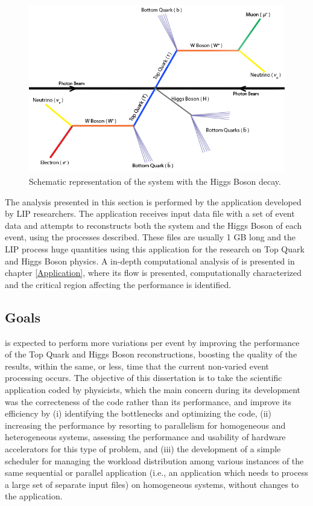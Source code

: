 \begin{figure}[!htp]
	\begin{center}
		\includegraphics[scale=0.5]{../../common/img/ttbar_higgs.png}
		\caption{Schematic representation of the \ttbar system with the Higgs Boson decay.}
		\label{fig:HiggsBosonDecay}
	\end{center}
\end{figure}

The analysis presented in this section is performed by the \tth application developed by LIP researchers. The application receives input data file with a set of event data and attempts to reconstructs both the \ttbar system and the Higgs Boson of each event, using the processes described. These files are usually 1 GB long and the LIP process huge quantities using this application for the research on Top Quark and Higgs Boson physics. A in-depth computational analysis of \tth is presented in chapter \ref{Application}, where its flow is presented, computationally characterized and the critical region affecting the performance is identified.

\subsection{Goals}
\label{Goals}

\tth is expected to perform more variations per event by improving the performance of the Top Quark and Higgs Boson reconstructions, boosting the quality of the results, within the same, or less, time that the current non-varied event processing occurs. The objective of this dissertation is to take the \tth scientific application coded by physicists, which the main concern during its development was the correcteness of the code rather than its performance, and improve its efficiency by (i) identifying the bottlenecks and optimizing the code, (ii) increasing the performance by resorting to parallelism for homogeneous and heterogeneous systems, assessing the performance and usability of hardware accelerators for this type of problem, and (iii) the development of a simple scheduler for managing the workload distribution among various instances of the same sequential or parallel application (i.e., an application which needs to process a large set of separate input files) on homogeneous systems, without changes to the application.

